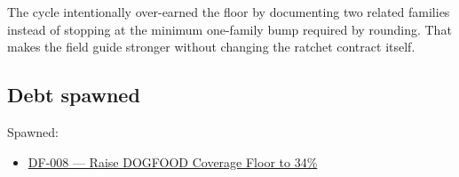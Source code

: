 The cycle intentionally over-earned the floor by documenting two related families instead of stopping at the minimum one-family bump required by rounding. That makes the field guide stronger without changing the ratchet contract itself.

\subsection{Debt spawned}\label{record-069-debt-spawned}

Spawned:

\begin{itemize}
\tightlist
\item
  \href{https://github.com/flyingrobots/bijou/blob/cbd70612140e7a450d764b3c7be1c6af878b99bc/docs/design/DF-008-raise-dogfood-coverage-floor-to-34-percent.md}{DF-008 --- Raise DOGFOOD Coverage Floor to 34\%}
\end{itemize}

